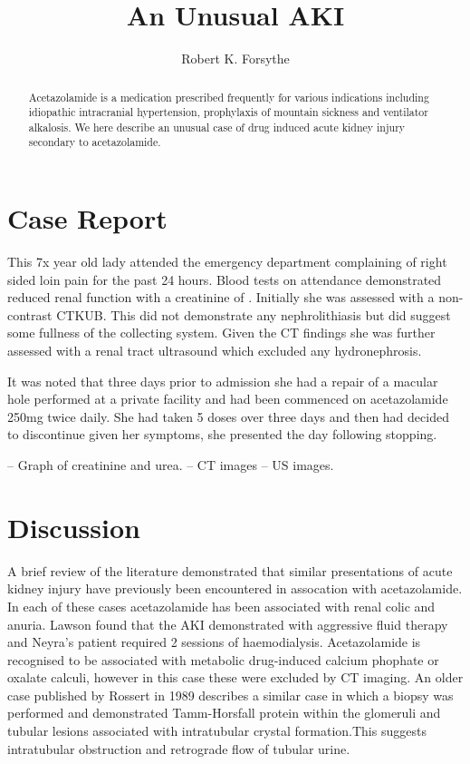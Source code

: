 \documentclass[11pt]{article}
\title{An Unusual AKI}
\author{Robert K. Forsythe}
\begin{document}
\maketitle
\begin{abstract}
	Acetazolamide is a medication prescribed frequently for various indications including idiopathic intracranial hypertension, prophylaxis of mountain sickness and ventilator alkalosis. We here describe an unusual case of drug induced acute kidney injury secondary to acetazolamide. 
\end{abstract}
		
\section*{Case Report}

This 7x year old lady attended the emergency department complaining of right sided loin pain for the past 24 hours. Blood tests on attendance demonstrated reduced renal function with a creatinine of \todo. Initially she was assessed with a non-contrast CTKUB. This did not demonstrate any nephrolithiasis but did suggest some fullness of the collecting system. Given the CT findings she was further assessed with a renal tract ultrasound which excluded any hydronephrosis. 

It was noted that three days prior to admission she had a repair of a macular hole performed at a private facility and had been commenced on acetazolamide 250mg twice daily. She had taken 5 doses over three days and then had decided to discontinue given her symptoms, she presented the day following stopping. 


-- Graph of creatinine and urea.
-- CT images
-- US images. 


\section*{Discussion}
A brief review of the literature demonstrated that similar presentations of acute kidney injury have previously been encountered in assocation with acetazolamide\cite{Neyra2014, Rossert1984, Lawson2020}. In each of these cases acetazolamide has been associated with renal colic and anuria. Lawson found that the AKI demonstrated with aggressive fluid therapy and Neyra's patient required 2 sessions of haemodialysis. Acetazolamide is recognised to be associated with metabolic drug-induced calcium phophate or oxalate calculi, however in this case these were excluded by CT imaging. An older case published by Rossert in 1989 describes a similar case in which a biopsy was performed and demonstrated Tamm-Horsfall protein within the glomeruli and tubular lesions associated with intratubular crystal formation.This suggests intratubular obstruction and retrograde flow of tubular urine\cite{Rossert1984}.  


\printbibliography
\end{document}
